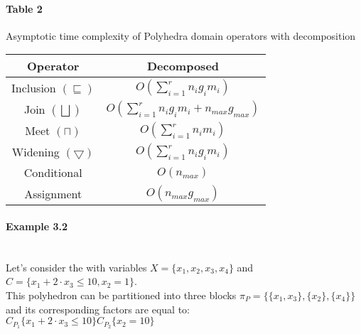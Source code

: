 \paragraph{Table 2} Asymptotic time complexity of Polyhedra domain operators with decomposition

\begin{center}
\begin{tabular}{||c c||} 
 
 \hline
 Operator & Decomposed  \\ [0.5ex] 
 \hline
 Inclusion $(\sqsubseteq)$ & $O(\sum_{i=1}^r n_ig_im_i)$\\ 
 \hline
 Join $(\bigsqcup)$ & $O(\sum_{i=1}^r n_i g_i m_i + n_{max} g_{max})$ \\
 \hline
 Meet $(\sqcap)$ & $O(\sum_{i=1}^r n_i m_i)$ \\
 \hline
 Widening $(\bigtriangledown)$ & $O(\sum_{i=1}^r n_i g_i m_i)$\\
 \hline
 Conditional & $O(n_{max})$ \\ 
 \hline
 Assignment & $O(n_{max}g_{max})$ \\ 
 
 
 \hline
\end{tabular}
\end{center}

 
\paragraph{Example 3.2} \mbox{}\\
Let's consider the with variables $X = \{x_1,x_2,x_3,x_4\}$ and $C = \{ x_1 + 2 \cdot x_3 \leq 10, x_2 = 1 \}$.\\
This polyhedron can be partitioned into three blocks $\pi_P = \{\{x_1,x_3\},\{x_2\},\{x_4\}\}$ and its corresponding factors are equal to:\\
$C_{P_1}\{x_1 + 2\cdot x_3 \leq 10 \} $\qquad$ C_{P_2}\{x_2 = 10 \}$

